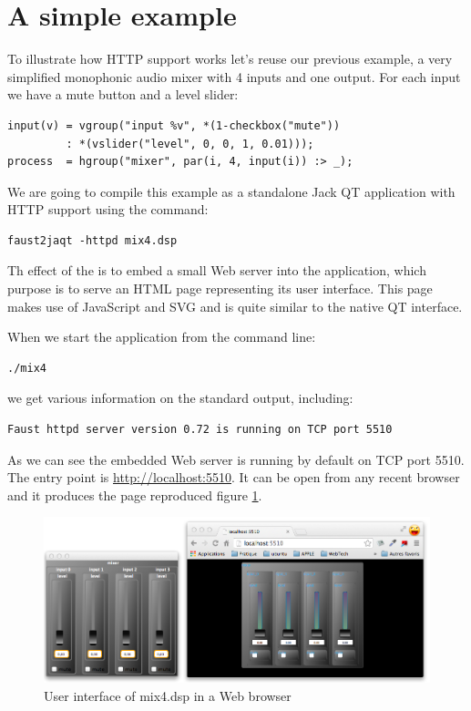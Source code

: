 \section{A simple example}

To illustrate how HTTP support works let's reuse our previous  example, a very simplified monophonic audio mixer with 4 inputs and one output. For each input we have a mute button and a level slider:
\begin{lstlisting}
input(v) = vgroup("input %v", *(1-checkbox("mute")) 
         : *(vslider("level", 0, 0, 1, 0.01)));
process  = hgroup("mixer", par(i, 4, input(i)) :> _);
\end{lstlisting}

We are going to compile this example as a standalone Jack QT application with HTTP support using the command:
\begin{lstlisting}
faust2jaqt -httpd mix4.dsp
\end{lstlisting}
Th effect of the  is to embed a small Web server into the application, which  purpose is to serve an HTML page representing its user interface. This page makes use of JavaScript and SVG and is quite similar to the native QT interface.

When we start the application from the command line:
\begin{lstlisting}
./mix4 
\end{lstlisting}
we get various information on the standard output, including:
\begin{lstlisting}
Faust httpd server version 0.72 is running on TCP port 5510
\end{lstlisting}

As we can see the embedded Web server is running by default on TCP port 5510. The entry point is \url{http://localhost:5510}. It can be open from any recent browser and it produces the page reproduced figure \ref{fig:mix4-http}.


\begin{figure}[h!]
  \centering
  \includegraphics[width=\textwidth]{images/mix4-http.png}
  \caption{User interface of mix4.dsp in a Web browser}   
  \label{fig:mix4-http}
\end{figure}


